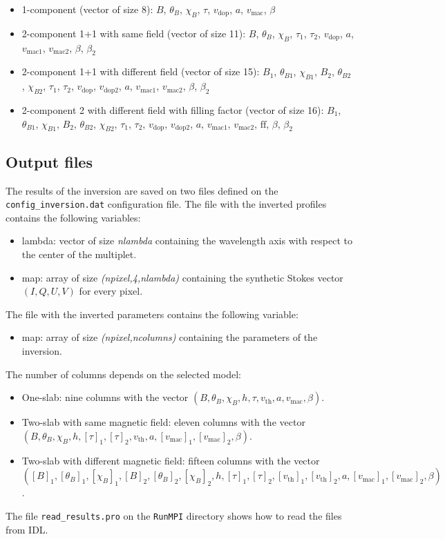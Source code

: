 \documentclass[12pt]{article}
\begin{document}
\begin{itemize}
\item 1-component (vector of size 8): $B$, $\theta_B$, $\chi_B$, $\tau$, $v_\mathrm{dop}$, $a$, $v_\mathrm{mac}$, $\beta$
\item 2-component 1+1 with same field (vector of size 11): $B$, $\theta_B$, $\chi_B$, $\tau_1$, $\tau_2$, $v_\mathrm{dop}$, $a$, $v_\mathrm{mac1}$, $v_\mathrm{mac2}$, $\beta$, $\beta_2$
\item 2-component 1+1 with different field (vector of size 15): $B_1$, $\theta_{B1}$, $\chi_{B1}$, $B_2$, $\theta_{B2}$, $\chi_{B2}$, $\tau_1$, $\tau_2$, $v_\mathrm{dop}$, $v_\mathrm{dop2}$, $a$, $v_\mathrm{mac1}$, $v_\mathrm{mac2}$, $\beta$, $\beta_2$
\item 2-component 2 with different field with filling factor (vector of size 16): $B_1$, $\theta_{B1}$, $\chi_{B1}$, $B_2$, $\theta_{B2}$, $\chi_{B2}$, $\tau_1$, $\tau_2$, $v_\mathrm{dop}$, $v_\mathrm{dop2}$, $a$, $v_\mathrm{mac1}$, $v_\mathrm{mac2}$, $\mathrm{ff}$, $\beta$, $\beta_2$
\end{itemize}


\subsection{Output files}
The results of the inversion are saved on two files defined on the \texttt{config\_inversion.dat} configuration
file. The file with the inverted profiles contains the following variables:
\begin{itemize}
\item lambda: vector of size \textit{nlambda} containing the wavelength axis with respect to the center of the multiplet.
\item map: array of size \textit{(npixel,4,nlambda)} containing the synthetic Stokes vector $(I,Q,U,V)$ for every pixel.
\end{itemize}
The file with the inverted parameters contains the following variable:
\begin{itemize}
\item map: array of size \textit{(npixel,ncolumns)} containing the parameters of the inversion. 
\end{itemize}
The number of columns depends on the selected model:
\begin{itemize}
\item One-slab: nine columns with the vector $(B,\theta_B,\chi_B,h,\tau,v_\mathrm{th},a,v_\mathrm{mac},\beta)$.
\item Two-slab with same magnetic field: eleven columns with the vector \\ $(B,\theta_B,\chi_B,h,[\tau]_1,[\tau]_2,v_\mathrm{th},a,[v_\mathrm{mac}]_1,
[v_\mathrm{mac}]_2,\beta)$.
\item Two-slab with different magnetic field: fifteen columns with the vector \\ $([B]_1,[\theta_B]_1,[\chi_B]_1,[B]_2,[\theta_B]_2,[\chi_B]_2,
h,[\tau]_1,[\tau]_2,[v_\mathrm{th}]_1,[v_\mathrm{th}]_2,a,[v_\mathrm{mac}]_1,[v_\mathrm{mac}]_2,\beta)$.
\end{itemize}
The file \texttt{read\_results.pro} on the \texttt{RunMPI} directory shows how to read the
files from IDL.
\end{document}
